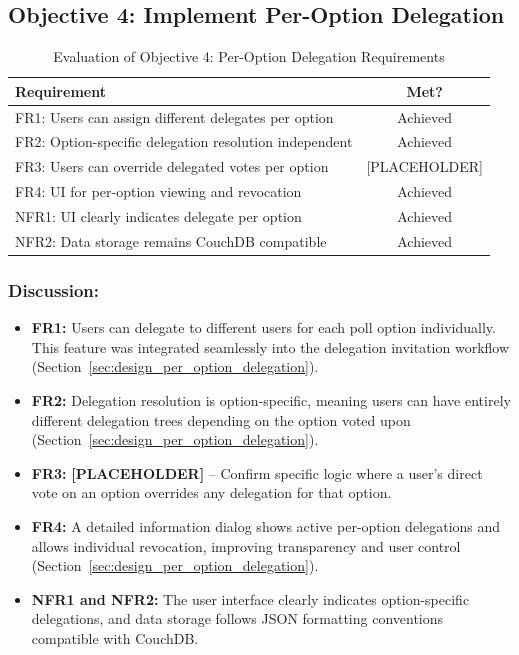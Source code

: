 \subsection{Objective 4: Implement Per-Option Delegation}

\begin{table}[H]
\centering
\begin{tabular}{|p{9cm}|c|}
\hline
\textbf{Requirement} & \textbf{Met?} \\ \hline
FR1: Users can assign different delegates per option & Achieved \\ \hline
FR2: Option-specific delegation resolution independent & Achieved \\ \hline
FR3: Users can override delegated votes per option & [PLACEHOLDER] \\ \hline
FR4: UI for per-option viewing and revocation & Achieved \\ \hline
NFR1: UI clearly indicates delegate per option & Achieved \\ \hline
NFR2: Data storage remains CouchDB compatible & Achieved \\ \hline
\end{tabular}
\caption{Evaluation of Objective 4: Per-Option Delegation Requirements}
\label{tab:objective4_requirements}
\end{table}

\subsubsection{Discussion:}

\begin{itemize}
    \item \textbf{FR1:} Users can delegate to different users for each poll option individually. This feature was integrated seamlessly into the delegation invitation workflow (Section~\ref{sec:design_per_option_delegation}).
    \item \textbf{FR2:} Delegation resolution is option-specific, meaning users can have entirely different delegation trees depending on the option voted upon (Section~\ref{sec:design_per_option_delegation}).
    \item \textbf{FR3:} \textbf{[PLACEHOLDER]} -- Confirm specific logic where a user's direct vote on an option overrides any delegation for that option.
    \item \textbf{FR4:} A detailed information dialog shows active per-option delegations and allows individual revocation, improving transparency and user control (Section~\ref{sec:design_per_option_delegation}).
    \item \textbf{NFR1 and NFR2:} The user interface clearly indicates option-specific delegations, and data storage follows JSON formatting conventions compatible with CouchDB.
\end{itemize}

